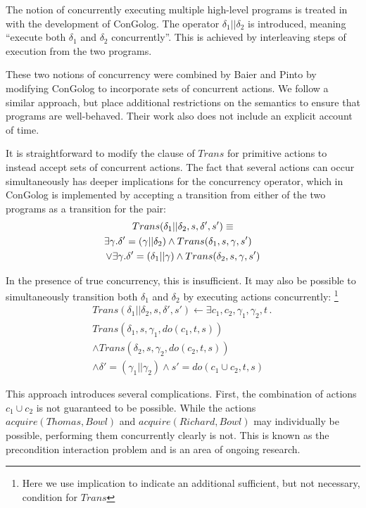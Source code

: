 \documentclass[letterpaper]{article}
\begin{document}
The notion of concurrently executing multiple high-level programs
is treated in \cite{giacomo00congolog} with the development of ConGolog.
The operator $\delta_{1}||\delta_{2}$ is introduced, meaning ``execute
both $\delta_{1}$ and $\delta_{2}$ concurrently''. This is achieved
by interleaving steps of execution from the two programs.

These two notions of concurrency were combined by Baier and Pinto
\cite{pinto99tcongolog} by modifying ConGolog to incorporate sets
of concurrent actions. We follow a similar approach, but place
additional restrictions on the semantics to ensure that programs are
well-behaved. Their work also does not include an explicit account
of time.

It is straightforward to modify the clause of $Trans$
for primitive actions to instead accept sets of concurrent actions.
The fact that several actions can occur simultaneously has
deeper implications for the concurrency operator, which in ConGolog
is implemented by accepting a transition from either of the two programs
as a transition for the pair:
\begin{multline}
Trans(\delta_{1}||\delta_{2},s,\delta',s')\equiv\\
\shoveright{\exists\gamma.\delta'=(\gamma||\delta_{2})\wedge Trans(\delta_{1},s,\gamma,s')}\\
\vee\exists\gamma.\delta'=(\delta_{1}||\gamma)\wedge Trans(\delta_{2},s,\gamma,s')
\end{multline}

In the presence of true concurrency, this is insufficient. It may
also be possible to simultaneously transition both $\delta_{1}$ and
$\delta_{2}$ by executing actions concurrently:%
\footnote{Here we use implication to indicate an additional sufficient, but
not necessary, condition for $Trans$ %
}
\begin{multline}
Trans(\delta_{1}||\delta_{2},s,\delta',s')\leftarrow \exists c_{1},c_{2},\gamma_{1},\gamma_{2},t\,.\,\\
 Trans(\delta_{1},s,\gamma_{1},do(c_{1},t,s))\\
 \wedge Trans(\delta_{2},s,\gamma_{2},do(c_{2},t,s))\\
 \wedge\delta'=(\gamma_{1}||\gamma_{2})\wedge s'=do(c_{1}\cup c_{2},t,s)
\end{multline}


This approach introduces several complications. First, the combination
of actions $c_{1}\cup c_{2}$ is not guaranteed to be possible. While
the actions $acquire(Thomas,Bowl)$ and $acquire(Richard,Bowl)$ may
individually be possible, performing them concurrently clearly is
not. This is known as the precondition interaction problem \cite{pinto94temporal}
and is an area of ongoing research.
\end{document}
